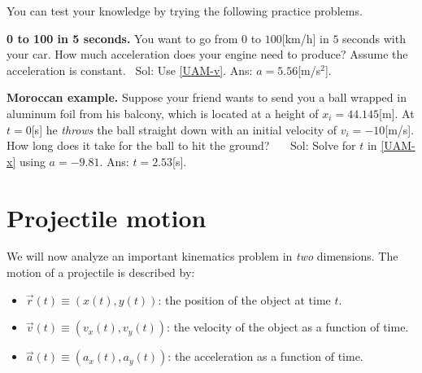 \documentclass[letterpaper,9pt,journal]{IEEEtran}
\newcommand{\dokuitalic}[1]{\textsl{#1}}
\newcommand{\dokuitem}{\item}
\begin{document}
\medskip
You can test your knowledge by trying the following practice problems.



{\bf 0 to 100 in 5 seconds.}
You want to go from $0$ to $100$[km/h] in $5$ seconds with your car.
How much acceleration does your engine need to produce?
Assume the acceleration is constant. \ Sol: Use \eqref{UAM-v}. Ans: $a=5.56$[m/s$^2$].



{\bf Moroccan example.}
Suppose your friend wants to send you a ball wrapped in aluminum 
foil from his balcony, which is located at a height of $x_i=44.145$[m]. 
At  $t=0$[s] he \dokuitalic{throws} the ball straight down with an initial velocity 
of $v_i=-10$[m/s]. How long does it take for the ball to hit the ground?
%
\ \ \ Sol: Solve for $t$ in \eqref{UAM-x} using $a=-9.81$.  Ans: $t=2.53$[s].










\section{Projectile motion}

We will now analyze an important kinematics problem in \emph{two} dimensions.
The motion of a projectile is described by:
\begin{itemize}
\dokuitem  $\vec{r}(t)\equiv (x(t),y(t))$: the position of the object at time $t$.
\dokuitem  $\vec{v}(t) \equiv (v_x(t), v_y(t) ) $: the velocity of the object as a function of time.
\dokuitem  $\vec{a}(t) \equiv (a_x(t), a_y(t) ) $: the acceleration as a function of time.
\end{itemize}
\end{document}
